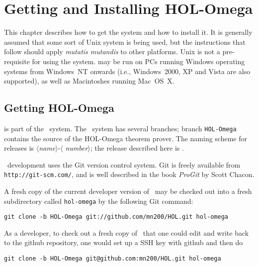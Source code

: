 \chapter{Getting and Installing HOL-Omega}
\label{install}

This chapter describes how to get the \HOLW{} system and how to install
it.  It is generally assumed that some sort of Unix system is being
used, but the instructions that follow should apply {\it mutatis
  mutandis\/} to other platforms.  Unix is not a pre-requisite for
using the system. \HOLW{} may be run on PCs running Windows operating
systems from Windows~NT onwards (i.e., Windows~2000, XP and Vista are
also supported), as well as Macintoshes running Mac~OS~X.

\section{Getting HOL-Omega}

\HOLW{} is part of the \HOL\ system.
The \HOL\ system has several branches; branch {\tt HOL-Omega} contains
the source of the HOL-Omega theorem prover.
The naming scheme for \holnw{}
releases is $\langle${\it name}$\rangle$-$\langle${\it
  number}$\rangle$; the release described here is \holnversion.

\HOL\ development uses the Git version control system.
Git is freely available from \texttt{http://git-scm.com/},
and is well described in the book {\it ProGit\/} by Scott Chacon.

A fresh copy of the current developer version of \HOLW\ may be checked out
into a fresh subdirectory called {\tt hol-omega} by the following Git command:
\begin{center}
\texttt{git clone -b HOL-Omega git://github.com/mn200/HOL.git hol-omega}
\end{center}

As a developer, to check out a fresh copy of \HOLW\ that one could
edit and write back to the github repository, one would set up a SSH key
with github and then do
\begin{center}
\texttt{git clone -b HOL-Omega git@github.com:mn200/HOL.git hol-omega}
\end{center}

